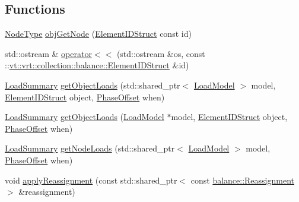 \subsection*{Functions}
\begin{DoxyCompactItemize}
\item 
\hyperlink{namespacevt_a866da9d0efc19c0a1ce79e9e492f47e2}{Node\+Type} \hyperlink{namespacevt_1_1vrt_1_1collection_1_1balance_a1258a78ae2c516a22bec429b3c68d43d}{obj\+Get\+Node} (\hyperlink{structvt_1_1vrt_1_1collection_1_1balance_1_1_element_i_d_struct}{Element\+I\+D\+Struct} const id)
\item 
std\+::ostream \& \hyperlink{namespacevt_1_1vrt_1_1collection_1_1balance_ab22202f7e2af89176c77091cd04b94f5}{operator$<$$<$} (std\+::ostream \&os, const \+::\hyperlink{structvt_1_1vrt_1_1collection_1_1balance_1_1_element_i_d_struct}{vt\+::vrt\+::collection\+::balance\+::\+Element\+I\+D\+Struct} \&id)
\item 
\hyperlink{structvt_1_1vrt_1_1collection_1_1balance_1_1_load_summary}{Load\+Summary} \hyperlink{namespacevt_1_1vrt_1_1collection_1_1balance_ae3bc5e1c68d2f55908748501fcba9146}{get\+Object\+Loads} (std\+::shared\+\_\+ptr$<$ \hyperlink{structvt_1_1vrt_1_1collection_1_1balance_1_1_load_model}{Load\+Model} $>$ model, \hyperlink{structvt_1_1vrt_1_1collection_1_1balance_1_1_element_i_d_struct}{Element\+I\+D\+Struct} object, \hyperlink{structvt_1_1vrt_1_1collection_1_1balance_1_1_phase_offset}{Phase\+Offset} when)
\item 
\hyperlink{structvt_1_1vrt_1_1collection_1_1balance_1_1_load_summary}{Load\+Summary} \hyperlink{namespacevt_1_1vrt_1_1collection_1_1balance_a5e4d4bdd2fceaebcb89d669b8a1b2361}{get\+Object\+Loads} (\hyperlink{structvt_1_1vrt_1_1collection_1_1balance_1_1_load_model}{Load\+Model} $\ast$model, \hyperlink{structvt_1_1vrt_1_1collection_1_1balance_1_1_element_i_d_struct}{Element\+I\+D\+Struct} object, \hyperlink{structvt_1_1vrt_1_1collection_1_1balance_1_1_phase_offset}{Phase\+Offset} when)
\item 
\hyperlink{structvt_1_1vrt_1_1collection_1_1balance_1_1_load_summary}{Load\+Summary} \hyperlink{namespacevt_1_1vrt_1_1collection_1_1balance_a3e23892df34e34f78bfa995cad0aa98e}{get\+Node\+Loads} (std\+::shared\+\_\+ptr$<$ \hyperlink{structvt_1_1vrt_1_1collection_1_1balance_1_1_load_model}{Load\+Model} $>$ model, \hyperlink{structvt_1_1vrt_1_1collection_1_1balance_1_1_phase_offset}{Phase\+Offset} when)
\item 
void \hyperlink{namespacevt_1_1vrt_1_1collection_1_1balance_a36a9f7b402e41e88d3840df04e39eb6c}{apply\+Reassignment} (const std\+::shared\+\_\+ptr$<$ const \hyperlink{structvt_1_1vrt_1_1collection_1_1balance_1_1_reassignment}{balance\+::\+Reassignment} $>$ \&reassignment)

\end{DoxyCompactItemize}
